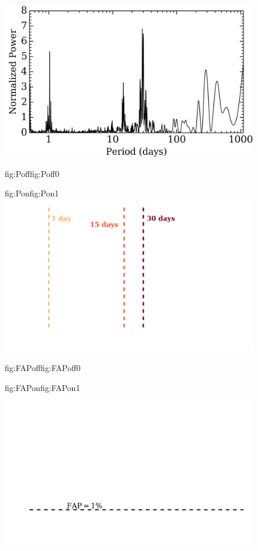 \begin{figure}
  \centering
  \includegraphics[width=0.8\hsize]{figures/WF_bkgd.png}%
  \hspace{-0.8\hsize}%
  \begin{ocg}{fig:Poff}{fig:Poff}{0}%
  \end{ocg}%
  \begin{ocg}{fig:Pon}{fig:Pon}{1}%
    \includegraphics[width=0.8\hsize]{figures/WF_Ps.png}%
  \end{ocg}
  \hspace{-0.8\hsize}%
  \begin{ocg}{fig:FAPoff}{fig:FAPoff}{0}%
  \end{ocg}%
  \begin{ocg}{fig:FAPon}{fig:FAPon}{1}%
    \includegraphics[width=0.8\hsize]{figures/WF_faps.png}%

\end{ocg}
\end{figure}
